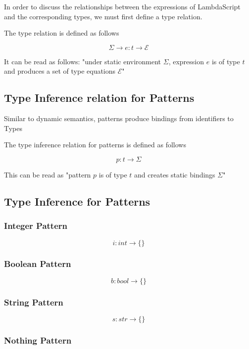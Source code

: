 \documentclass[titlepage]{article}
\begin{document}
In order to discuss the relationships between the expressions of LambdaScript and the corresponding types, we must first define a type relation.

The type relation is defined as follows

$$\Sigma \rightarrow e : t \rightarrow \mathcal{E}$$

It can be read as follows: "under static environment $\Sigma$, expression $e$ is of type $t$ and produces a set of type equations $\mathcal{E}$"

\subsection{Type Inference relation for Patterns}

Similar to dynamic semantics, patterns produce bindings from identifiers to Types

The type inference relation for patterns is defined as follows

$$p : t \rightarrow \Sigma$$

This can be read as "pattern $p$ is of type $t$ and creates static bindings $\Sigma$"

\subsection{Type Inference for Patterns}

\subsubsection{Integer Pattern}

$$i : int \rightarrow \{\}$$

\subsubsection{Boolean Pattern}

$$b : bool \rightarrow \{\}$$

\subsubsection{String Pattern}

$$s : str \rightarrow \{\}$$

\subsubsection{Nothing Pattern}
\end{document}
